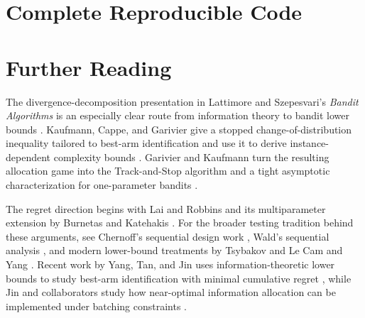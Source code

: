 \documentclass[en,nofont,11pt]{elegantbook}
\begin{document}
\chapter*{Complete Reproducible Code}



\chapter*{Further Reading}

The divergence-decomposition presentation in Lattimore and Szepesvari's \emph{Bandit Algorithms} is an especially clear route from information theory to bandit lower bounds \cite{lattimore2020bandit}. Kaufmann, Cappe, and Garivier give a stopped change-of-distribution inequality tailored to best-arm identification and use it to derive instance-dependent complexity bounds \cite{kaufmann2016complexity}. Garivier and Kaufmann turn the resulting allocation game into the Track-and-Stop algorithm and a tight asymptotic characterization for one-parameter bandits \cite{garivier2016track}.

The regret direction begins with Lai and Robbins \cite{lai1985} and its multiparameter extension by Burnetas and Katehakis \cite{burnetas1996adaptive}. For the broader testing tradition behind these arguments, see Chernoff's sequential design work \cite{chernoff1959sequential}, Wald's sequential analysis \cite{wald1947sequential}, and modern lower-bound treatments by Tsybakov \cite{tsybakov2009nonparametric} and Le Cam and Yang \cite{lecam2000asymptotics}. Recent work by Yang, Tan, and Jin uses information-theoretic lower bounds to study best-arm identification with minimal cumulative regret \cite{yang2024minimal}, while Jin and collaborators study how near-optimal information allocation can be implemented under batching constraints \cite{jin2024batchedbai}.

\nocite{lattimore2020bandit,kaufmann2016complexity,garivier2016track,lai1985,burnetas1996adaptive,chernoff1959sequential,wald1947sequential,tsybakov2009nonparametric,lecam2000asymptotics,mannor2004sample,yang2024minimal,jin2024batchedbai}
\printbibliography
\end{document}

